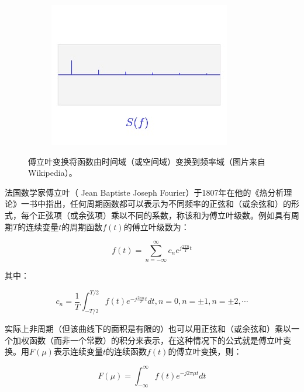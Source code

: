 \documentclass[10pt,fancyhdr,graybox, envcountchap,oribibl,twoside]{svmono}
\begin{document}
\begin{figure}
\begin{fullwidth}
\begin{subfigure}[b]{0.33\textwidth}
		\includegraphics[width=1.\textwidth]{figures/intro/fourier-3}
	\end{subfigure}
\caption{傅立叶变换将函数由时间域（或空间域）变换到频率域（图片来自Wikipedia）。}
\label{f:intro-fourier}
\end{fullwidth}
\end{figure}


法国数学家傅立叶（ Jean Baptiste Joseph Fourier）于1807年在他的《热分析理论》一书中指出，任何周期函数都可以表示为不同频率的正弦和（或余弦和）的形式，每个正弦项（或余弦项）乘以不同的系数，称该和为傅立叶级数。例如具有周期$T$的连续变量$t$的周期函数$f(t)$的傅立叶级数为：

\begin{equation}
	f(t)=\sum^{\infty}_{n=-\infty}c_n e^{j\frac{2\pi n}{T}t}
\end{equation}

其中：

\begin{equation}
	c_n=\frac{1}{T}\int^{T/2}_{-T/2}f(t)e^{-j\frac{2\pi n}{T}t}dt, n=0,n=\pm 1,n=\pm 2,\cdots
\end{equation}

实际上非周期（但该曲线下的面积是有限的）也可以用正弦和（或余弦和）乘以一个加权函数（而非一个常数）的积分来表示，在这种情况下的公式就是傅立叶变换。用$F(\mu)$表示连续变量$t$的连续函数$f(t)$的傅立叶变换，则：

\begin{equation}\label{eq:intro-fourier}
	F(\mu)=\int^{\infty}_{-\infty}f(t)e^{-j2\pi\mu t}dt
\end{equation}
\end{document}
